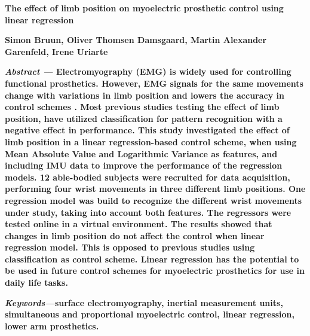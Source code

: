 %
		
\begin{center}	
	{\huge\textbf{The effect of limb position on myoelectric prosthetic control using linear regression}}
	
	
	{\large \textbf{Simon Bruun, Oliver Thomsen Damsgaard, Martin Alexander Garenfeld, Irene Uriarte}}
\end{center}
	
	\begin{multicols}{2}


%		
\textbf{\textit{Abstract ---} Electromyography (EMG) is widely used for controlling functional prosthetics. However, EMG signals for the same movements change with variations in limb position and lowers the accuracy in control schemes \cite{fougner2012}. Most previous studies testing the effect of limb position, have utilized classification for pattern recognition with a negative effect in performance. This study investigated the effect of limb position in a linear regression-based control scheme, when using Mean Absolute Value and Logarithmic Variance as features, and including IMU data to improve the performance of the regression models. 12 able-bodied subjects were recruited for data acquisition, performing four wrist movements in three different limb positions. One regression model was build to recognize the different wrist movements under study, taking into account both features. The regressors were tested online in a virtual environment. The results showed that changes in limb position do not affect the control when linear regression model.
This is opposed to previous studies using classification as control scheme. Linear regression has the potential to be used in future control schemes for myoelectric prosthetics for use in daily life tasks.\\}
		
\textbf{\textit{Keywords---}surface electromyography, inertial measurement units, simultaneous and proportional myoelectric control, linear regression, lower arm prosthetics.}
	
	

\end{multicols}
